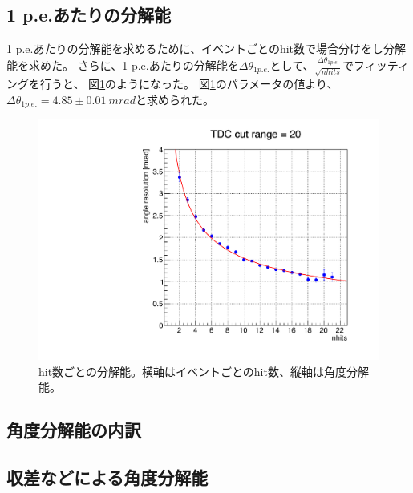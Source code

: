 \documentclass[uplatex, titlepage, dvipdfmx, 12pt, a4paper]{jsreport}
\begin{document}
    \subsection{1 p.e.あたりの分解能}
    1 p.e.あたりの分解能を求めるために、イベントごとのhit数で場合分けをし分解能を求めた。
    さらに、1 p.e.あたりの分解能を$\Delta \theta_{1 p.e.}$として、$\frac{\Delta \theta_{1 p.e.}}{\sqrt{nhits}}$でフィッティングを行うと、
    図\ref{fig:per_hit}のようになった。
    図\ref{fig:per_hit}のパラメータの値より、$\Delta \theta_{1 p.e.} = 4.85 \pm 0.01 \: \si{mrad}$と求められた。
    \begin{figure}[htbp]
      \begin{center} 
        \includegraphics[scale=0.3, clip]{image/per_hit.pdf}
        \caption{hit数ごとの分解能。横軸はイベントごとのhit数、縦軸は角度分解能。} 
        \label{fig:per_hit} 
      \end{center}
    \end{figure}
    
    
    
    \subsection{角度分解能の内訳}
    
    \subsection{収差などによる角度分解能}
    
\end{document}
